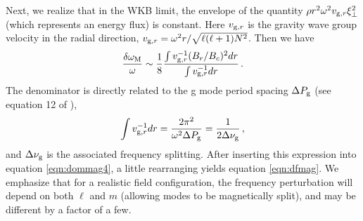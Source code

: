 Next, we realize that in the WKB limit, the envelope of the quantity $\rho r^2 \omega^2 v_{{\rm g},r} \xi_\perp^2$ (which represents an energy flux) is constant. Here $v_{{\rm g},r}$ is the gravity wave group velocity in the radial direction, $v_{{\rm g},r} = \omega^2 r/\sqrt{\ell(\ell+1)N^2}$. Then we have
\begin{equation}
\label{eqn:dommag4}
\frac{\delta \omega_{\rm M}}{\omega} \sim \frac{1}{8} \frac{\int v_{{\rm g},r}^{-1} (B_r/B_c)^2 d r }{\int v_{{\rm g},r}^{-1} d r }\, .
\end{equation}
The denominator is directly related to the g mode period spacing $\Delta P_{\rm g}$ (see equation 12 of \cite{Chaplin_2013}),
\begin{equation}
\label{eqn:dpg}
\int v_{{\rm g},r}^{-1} dr = \frac{2 \pi^2}{\omega^2 \Delta P_{\rm g}} = \frac{1}{2 \Delta \nu_{\rm g}} \, ,
\end{equation}
and $\Delta \nu _{\rm g}$ is the associated frequency splitting. After inserting this expression into equation \ref{eqn:dommag4}, a little rearranging yields equation \ref{eqn:dfmag}. We emphasize that for a realistic field configuration, the frequency perturbation will depend on both $\ell$ and $m$ (allowing modes to be magnetically split), and may be different by a factor of a few.

